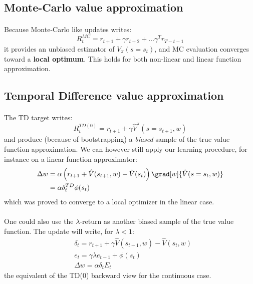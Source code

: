 \documentclass[a4paper]{article}
\begin{document}
{		\subsection{Monte-Carlo value approximation}
		{
			\paragraph{} Because Monte-Carlo like updates writes:
			\begin{equation}
				R_t^{MC} = r_{t+1} + \gamma r_{t+2} + \hdots \gamma^T r_{T-t-1}
			\end{equation}
			it provides an unbiased estimator of $V_\pi(s=s_t)$, and MC evaluation converges toward a \textbf{local optimum}. This holds for both non-linear and linear function approximation. 
		}
		\subsection{Temporal Difference value approximation}
		{
			\paragraph{} The TD target writes:
			\begin{equation}
				R_t^{TD(0)} = r_{t+1} + \gamma \hat{V}^\pi(s=s_{t+1},w)
			\end{equation}
			and produce (because of bootstrapping) a \emph{biased} sample of the true value function approximation. 
			We can however still apply our learning procedure, for instance on a linear function approximator:
			\begin{equation}
				\begin{aligned}
					\Delta w &= \alpha\left( r_{t+1} + \hat{V}(s_{t+1},w) - \hat{V}(s_t)\right)\grad[w]{\hat{V}(s=s_t,w)}\\
						      &= \alpha \delta_t^{TD}\phi(s_t)
				\end{aligned}
			\end{equation}
			which was proved to converge to a local optimizer in the linear case. 
			
			\paragraph{} One could also use the $\lambda$-return as another biased sample of the true value function. The update will write, for $\lambda<1$:
			\begin{equation}
				\begin{aligned}
					&\delta_t = r_{t+1} + \gamma \hat{V}(s_{t+1},w) - \hat{V}(s_t,w) \\
					&e_t = \gamma \lambda e_{t-1} + \phi(s_t) \\
					&\Delta w = \alpha \delta_t E_t
				\end{aligned}
			\end{equation}
			the equivalent of the TD(0) backward view for the continuous case.
		}
}
\end{document}
